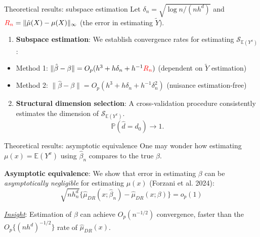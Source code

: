 \documentclass[
  ignorenonframetext,
  aspectratio=169,
  11pt]{beamer}
\providecommand{\tightlist}{%
  \setlength{\itemsep}{0pt}\setlength{\parskip}{0pt}}
\begin{document}
\begin{frame}{Theoretical results: subspace estimation}
\protect{}\label{theoretical-results-subspace-estimation}
Let \(\delta_n=\sqrt{{\log n} / ({nh^d})}\) and
\(\textcolor{red}{R_n}=\lVert \hat{\mu}(X)- \mu(X)\rVert_\infty\) (the
error in estimating \(\widetilde{Y}\)).

\pause

\vspace{0.34cm}

\begin{enumerate}
\tightlist
\item
  \textbf{Subspace estimation}: We establish convergence rates for
  estimating \(\mathcal{S}_{\mathbb{E}(Y^x)}\):
\end{enumerate}

\begin{itemize}
\tightlist
\item
  Method 1:
  \(\lVert \hat{\beta} - \beta\rVert = O_p(h^3+h\delta_n+h^{-1}\textcolor{red}{R_n})\)
  (dependent on \(\widetilde{Y}\) estimation)
\item
  Method 2:
  \(\lVert \hat{\beta} - \beta\rVert = O_p(h^3+h\delta_n+h^{-1}\delta_n^2)\)
  (nuisance estimation-free)
\end{itemize}

\pause

\vspace{0.34cm}

\begin{enumerate}
\setcounter{enumi}{1}
\tightlist
\item
  \textbf{Structural dimension selection}: A cross-validation procedure
  consistently estimates the dimension of
  \(\mathcal{S}_{\mathbb{E}(Y^x)}\). \[
  \mathbb{P}(\widehat d=d_0)\longrightarrow 1.
  \]
\end{enumerate}
\end{frame}

\begin{frame}{Theoretical results: asymptotic equivalence}
\protect{}\label{theoretical-results-asymptotic-equivalence}
One may wonder how estimating \(\mu(x)=\mathbb{E}(Y^x)\) using
\(\hat{\beta}_n\) compares to the true \(\beta\).

\pause

\textbf{Asymptotic equivalence}: We show that error in estimating
\(\beta\) can be \textit{asymptotically negligible} for estimating
\(\mu(x)\) {\color{emoryblue}(Forzani et al. 2024)}: \[
\sqrt{nh_n^d} \big\{ \hat{\mu}_{DR}({x}; \hat{\beta}_n) - \hat{\mu}_{DR}({x}; \beta) \big\} = o_p(1)
\]

\underline{\textit{Insight}}: Estimation of \(\beta\) can achieve
\(O_p(n^{-1/2})\) convergence, faster than the \(O_p\{(nh^d)^{-1/2}\}\)
rate of \(\hat{\mu}_{DR}(x)\).
\end{frame}
\end{document}
